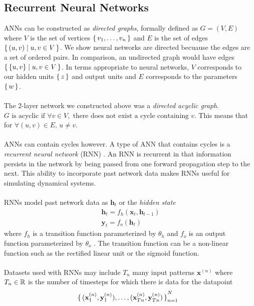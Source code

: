 \subsection{Recurrent Neural Networks}
ANNs can be constructed as \textit{directed graphs}, formally defined as $G = (V, E)$ where 
$V$ is the set of vertices $\set{v_1, \ldots, v_n}$ and $E$ is the set of edges 
$\set{(u,v) | u, v \in V}$. We show neural networks are directed becuause the edges are a 
set of ordered pairs. In comparison, an undirected graph would have edges 
$\set{ \{ u,v \} | u, v \in V}$.
In terms appropriate to neural networks, $V$ corresponds to our hidden units $\set{z}$ 
and output units and $E$ corresponds to the parameters $\set{w}$.
\\\\
The 2-layer network we constructed above was a \textit{directed acyclic graph}.
$G \text{ is acyclic if } \forall v \in V, \text{ there does not exist a cycle
containing } v$. This means that for $\forall (u,v) \in E \text{, } u \neq v$.
\\\\
ANNs can contain cycles however. A type of ANN that contains cycles is a 
\textit{recurrent neural network} (RNN) \cite{RumHinWil:86}. An RNN is recurrent in that 
information persists in the network by being passed from one forward propagation step to 
the next. This ability to incorporate past network data makes RNNs useful for simulating 
dynamical systems.
\\\\
RNNs model past network data as $\mathbf{h}_{t}$ or the \textit{hidden state}
\begin{align}
    &\mathbf{h}_t = f_{h}(\mathbf{x}_t, \mathbf{h}_{t-1}) \\
    &\mathbf{y}_t = f_{o}(\mathbf{h}_t)
\end{align} where $f_{h}$ is a transition function parameterized by $\theta_{h}$ 
and $f_{o}$ is an output function parameterized by $\theta_{o}$ \cite{PasGulChoBen:13}.
The transition function can be a non-linear function such as the rectified linear unit
or the sigmoid function.
\\\\
Datasets used with RNNs may include $T_n$ many input patterns $\mathbf{x}^{(n)}$
where $T_n \in \mathbb R$ is the number of timesteps for which there is data for the 
datapoint 
\begin{equation}
    \set{(\mathbf{x}_{1}^{(n)}, \mathbf{y}_{1}^{(n)}), \ldots, 
    (\mathbf{x}_{Tn}^{(n)}, \mathbf{y}_{Tn}^{(n)}) }_{n=1}^N 
\end{equation}
